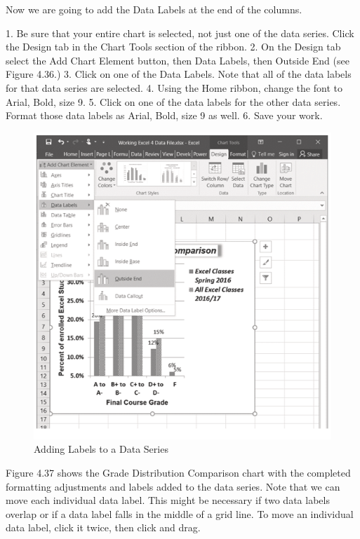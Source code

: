 Now we are going to add the Data Labels at the end of the columns.

1. Be sure that your entire chart is selected, not just one of the data series. Click the Design tab in
the Chart Tools section of the ribbon.
2. On the Design tab select the Add Chart Element button, then Data Labels, then Outside
End (see Figure 4.36.)
3. Click on one of the Data Labels. Note that all of the data labels for that data series are selected.
4. Using the Home ribbon, change the font to Arial, Bold, size 9.
5. Click on one of the data labels for the other data series. Format those data labels as Arial, Bold,
size 9 as well.
6. Save your work.



\begin{figure}[H]
	\centering
	\includegraphics[width=\maxwidth{.95\linewidth}]{gfx/ch04_fig37}
	\caption{Adding Labels to a Data Series}
	\label{04:fig37}
\end{figure}


Figure 4.37 shows the Grade Distribution Comparison chart with the completed formatting
adjustments and labels added to the data series. Note that we can move each individual data label. This
might be necessary if two data labels overlap or if a data label falls in the middle of a grid line. To move
an individual data label, click it twice, then click and drag.



